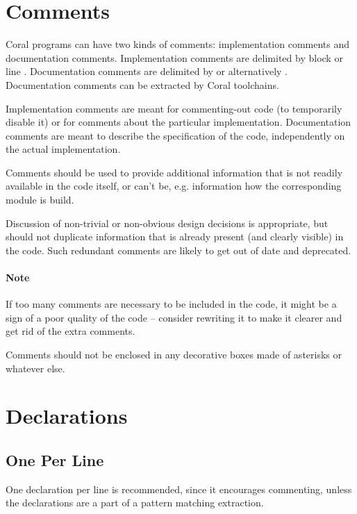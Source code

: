\section{Comments}

Coral programs can have two kinds of comments: implementation comments and documentation comments. Implementation comments are delimited by block \code{/* $\ \ldots$ */} or line \code{//}. Documentation comments are delimited by \code{/*! $\ \ldots$ */} or alternatively \code{/** $\ \ldots$ */}. Documentation comments can be extracted by Coral toolchains. 

Implementation comments are meant for commenting-out code (to temporarily disable it) or for comments about the particular implementation. Documentation comments are meant to describe the specification of the code, independently on the actual implementation. 

Comments should be used to provide additional information that is not readily available in the code itself, or can't be, e.g. information how the corresponding module is build. 

Discussion of non-trivial or non-obvious design decisions is appropriate, but should not duplicate information that is already present (and clearly visible) in the code. Such redundant comments are likely to get out of date and deprecated. 

\paragraph{Note}
If too many comments are necessary to be included in the code, it might be a sign of a poor quality of the code -- consider rewriting it to make it clearer and get rid of the extra comments. 

Comments should not be enclosed in any decorative boxes made of asterisks or whatever else. 





\section{Declarations}






\subsection{One Per Line}

One declaration per line is recommended, since it encourages commenting, unless the declarations are a part of a pattern matching extraction. 


